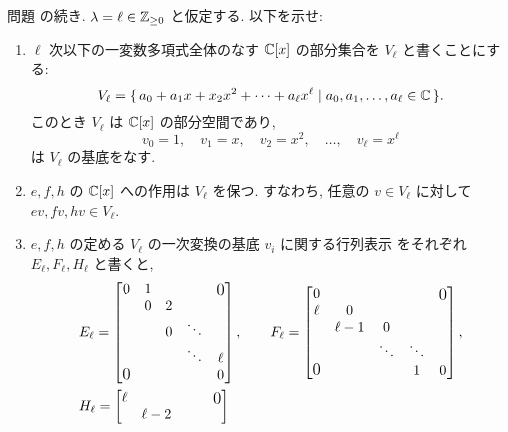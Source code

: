 \documentclass[12pt,twoside]{jarticle}
\begin{document}
\begin{question}[15点]
  \label{q:sl2-2}
  問題  の続き.
  $\lambda=\ell\in{\mathbb Z}_{\ge0}$ と仮定する. 以下を示せ:
  \begin{enumerate}
  \item $\ell$ 次以下の一変数多項式全体のなす ${\mathbb C}[x]$ の部分集合を $V_\ell$ 
    と書くことにする:
    \begin{equation*}
      V_\ell 
      = \{\, a_0 + a_1x + x_2x^2 + \cdots + a_\ell x^\ell
      \mid a_0,a_1,\ldots,a_\ell\in{\mathbb C} \,\}.
    \end{equation*}
    このとき $V_\ell$ は ${\mathbb C}[x]$ の部分空間であり, 
    \begin{equation*}
      v_0 = 1, \quad
      v_1 = x, \quad
      v_2 = x^2, \quad
      \ldots, \quad
      v_\ell = x^\ell
    \end{equation*}
    は $V_\ell$ の基底をなす.
  \item $e,f,h$ の ${\mathbb C}[x]$ への作用は $V_\ell$ を保つ.
    すなわち, 任意の $v\in V_\ell$ に対して $ev,fv,hv\in V_\ell$.
  \item $e,f,h$ の定める $V_\ell$ の一次変換の基底 $v_i$ に関する行列表示
    をそれぞれ $E_\ell,F_\ell,H_\ell$ と書くと,
    \begin{align*}
      &
      E_\ell =
      \begin{bmatrix}
        0 & 1 &   & & \bigzerou \\
          & 0 & 2 & & \\
          &   & 0 & \ddots & \\
          &   &   & \ddots & \ell \\
        \bigzerol & & &    & 0 \\
      \end{bmatrix},
      \qquad
      F_\ell =
      \begin{bmatrix}
        0    & & & & \bigzerou \\
        \ell &    0   & & & \\
             & \ell-1 & 0      & & \\
             &        & \ddots & \ddots & \\
        \bigzerol & &          &    1   & 0 \\
      \end{bmatrix},
      \\ &
      H_\ell =
      \begin{bmatrix}
        \ell & & & & \bigzerou \\
             & \ell-2 & & & \\

\end{bmatrix}
\end{align*}
\end{enumerate}
\end{question}
\end{document}
